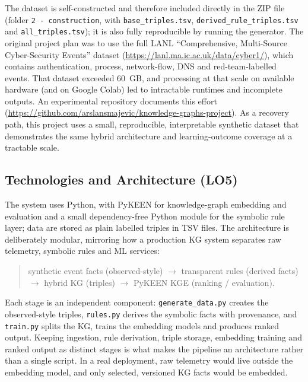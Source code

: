 \documentclass{article}
\begin{document}
The dataset is self-constructed and therefore included directly in the ZIP
file (folder \texttt{2 - construction}, with \texttt{base\_triples.tsv},
\texttt{derived\_rule\_triples.tsv} and \texttt{all\_triples.tsv}); it is also
fully reproducible by running the generator. The original project plan was to
use the full LANL ``Comprehensive, Multi-Source Cyber-Security Events''
dataset (\url{https://lanl.ma.ic.ac.uk/data/cyber1/}), which contains
authentication, process, network-flow, DNS and red-team-labelled events. That
dataset exceeded 60~GB, and processing at that scale on available hardware
(and on Google Colab) led to intractable runtimes and incomplete outputs. An
experimental repository documents this effort
(\url{https://github.com/arslansmajevic/knowledge-graphs-project}). As a
recovery path, this project uses a small, reproducible, interpretable
synthetic dataset that demonstrates the same hybrid architecture and
learning-outcome coverage at a tractable scale.

\subsection{Technologies and Architecture (LO5)}
\label{sec:architecture}
The system uses Python, with PyKEEN for knowledge-graph embedding and
evaluation and a small dependency-free Python module for the symbolic rule
layer; data are stored as plain labelled triples in TSV files. The
architecture is deliberately modular, mirroring how a production KG system
separates raw telemetry, symbolic rules and ML services:
\begin{quote}
synthetic event facts (observed-style) $\rightarrow$ transparent rules
(derived facts) $\rightarrow$ hybrid KG (triples) $\rightarrow$ PyKEEN KGE
(ranking / evaluation).
\end{quote}
Each stage is an independent component: \texttt{generate\_data.py} creates the
observed-style triples, \texttt{rules.py} derives the symbolic facts with
provenance, and \texttt{train.py} splits the KG, trains the embedding models
and produces ranked output. Keeping ingestion, rule derivation, triple
storage, embedding training and ranked output as distinct stages is what makes
the pipeline an architecture rather than a single script. In a real
deployment, raw telemetry would live outside the embedding model, and only
selected, versioned KG facts would be embedded.
\end{document}
